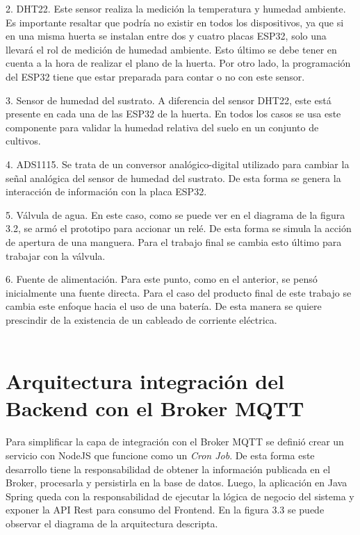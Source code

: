 2. DHT22. Este sensor realiza la medición la temperatura y humedad ambiente. Es importante resaltar que podría no existir en todos los dispositivos, ya que si en una misma huerta se instalan entre dos y cuatro placas ESP32, solo una llevará el rol de medición de humedad ambiente. Esto último se debe tener en cuenta a la hora de realizar el plano de la huerta. Por otro lado, la programación del ESP32 tiene que estar preparada para contar o no con este sensor.

3. Sensor de humedad del sustrato. A diferencia del sensor DHT22, este está presente en cada una de las ESP32 de la huerta. En todos los casos se usa este componente para validar la humedad relativa del suelo en un conjunto de cultivos.

4. ADS1115. Se trata de un conversor analógico-digital utilizado para cambiar la señal analógica del sensor de humedad del sustrato. De esta forma se genera la interacción de información con la placa ESP32.

5. Válvula de agua. En este caso, como se puede ver en el diagrama de la figura 3.2, se armó el prototipo para accionar un relé. De esta forma se simula la acción de apertura de una manguera. Para el trabajo final se cambia esto último para trabajar con la válvula.

6. Fuente de alimentación. Para este punto, como en el anterior, se pensó inicialmente una fuente directa. Para el caso del producto final de este trabajo se cambia este enfoque hacia el uso de una batería. De esta manera se quiere prescindir de la existencia de un cableado de corriente eléctrica.\\ \\


\section{Arquitectura integración del Backend con el Broker MQTT}

Para simplificar la capa de integración con el Broker MQTT se definió crear un servicio con NodeJS que funcione como un \textit{Cron Job}. De esta forma este desarrollo tiene la responsabilidad de obtener la información publicada en el Broker, procesarla y persistirla en la base de datos. Luego, la aplicación en Java Spring queda con la responsabilidad de ejecutar la lógica de negocio del sistema y exponer la API Rest para consumo del Frontend. En la figura 3.3 se puede observar el diagrama de la arquitectura descripta.

